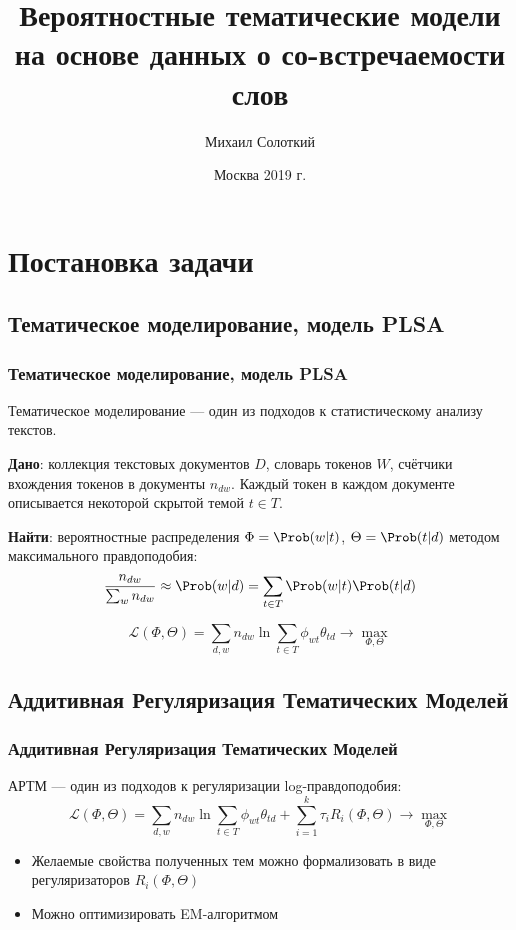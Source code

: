 \documentclass[unicode]{beamer}
\title[]{Вероятностные тематические модели на основе данных о со-встречаемости слов}
\author{Михаил Солоткий}
\institute[ВМК МГУ] %
{
    Московский государственный университет им. М. В. Ломоносова \\
    Факультет вычислительной математики и кибернетики \\
    Кафедра математических методов прогнозирования \\
    \bigskip
    {\bf Выпускная квалификационная работа бакалавра} \\
    \bigskip
    Научный руководитель --- д.ф-м.н. Воронцов К. В.
    \bigskip
}
\date{Москва 2019 г.} %
\begin{document}
\begin{frame}
\titlepage %
\end{frame}


\section{Постановка задачи}

\subsection{Тематическое моделирование, модель PLSA}
\begin{frame}
\frametitle{Тематическое моделирование, модель PLSA}
Тематическое моделирование --- один из подходов к статистическому анализу текстов. \newline

{\bf Дано}: коллекция текстовых документов $D$, словарь токенов $W$, счётчики вхождения токенов в документы $n_{dw}$. Каждый токен в каждом документе описывается некоторой скрытой темой $t \in T$. \newline

{\bf Найти}: вероятностные распределения $\Phi = \Prob(w | t)$, $\Theta = \Prob(t | d)$ методом максимального правдоподобия:
$$\frac{n_{dw}}{\sum_w n_{dw}} \approx \Prob(w | d) = \sum_{t \in T} \Prob(w | t) \Prob(t | d)$$

$$\mathcal{L}(\Phi, \Theta) = \sum_{d, w} n_{dw} \ln \sum_{t \in T} \phi_{wt} \theta_{td} \rightarrow \max_{\Phi, \Theta}$$
\end{frame}


\subsection{Аддитивная Регуляризация Тематических Моделей}
\begin{frame}
\frametitle{Аддитивная Регуляризация Тематических Моделей}
АРТМ --- один из подходов к регуляризации log-правдоподобия:
$$\mathcal{L}(\Phi, \Theta) = \sum_{d, w} n_{dw} \ln \sum_{t \in T} \phi_{wt} \theta_{td} + \sum_{i=1}^k \tau_i R_i(\Phi, \Theta) \rightarrow \max_{\Phi, \Theta}$$
\begin{itemize}
    \item Желаемые свойства полученных тем можно формализовать в виде регуляризаторов $R_i(\Phi, \Theta)$
    \item Можно оптимизировать EM-алгоритмом
\end{itemize}
\end{frame}
\end{document}
